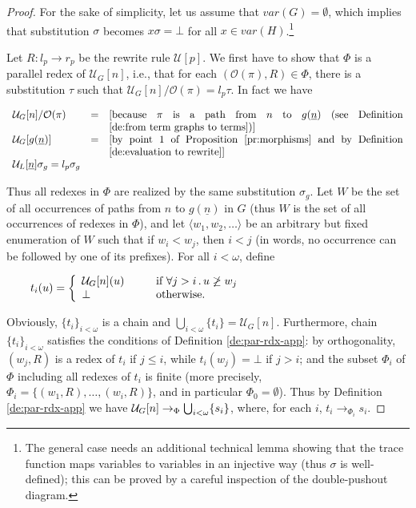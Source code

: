 \documentclass{eptcs}
\theoremstyle{plain}
\theoremstyle{definition}
\begin{document}
\begin{proof} 
For the sake of simplicity, let us assume that $var(G) = \emptyset$, 
which implies that substitution $\sigma$ becomes $x\sigma = \bot $ for 
all $x \in var(H)$.\footnote{The general case needs an 
additional technical lemma showing that the trace function maps 
variables to variables in an injective way (thus $\sigma$ is 
well-defined); this can be proved by a careful inspection of the 
double-pushout diagram.}

Let $R: l_p \rightarrow r_p$ be the rewrite rule $\mathcal{
U}[p]$. We first have to show that $\Phi$ is a parallel redex of 
$\mathcal{U}_G[n]$, i.e., that for each $(\mathcal{O}(\pi), R) \in \Phi$, 
there is a substitution $\tau$ such that $\mathcal{U}_G[n] / \mathcal{
O}(\pi) = l_p\tau$. In fact we have

\[\begin{array}{llp{10cm}}
\mathcal{U}_G[n] / \mathcal{O}(\pi) & = & [because $\pi$ is a path from $n$ 
to $g(\underline{n})$ (see Definition \ref{de:from term graphs to 
terms})]\\
\mathcal{U}_G[g(\underline{n})] & = & [by point 1 of Proposition 
\ref{pr:morphisms} and by Definition \ref{de:evaluation to rewrite}]\\
\mathcal{U}_L[\underline{n}]\sigma_g = l_p\sigma_g& &
\end{array}\]

\noindent
Thus all redexes in $\Phi$ are realized by the same substitution 
$\sigma_g$. Let $W$ be the set of all occurrences of paths from $n$ to 
$g(\underline{n})$ in $G$ (thus $W$ is the set of all occurrences of 
redexes in $\Phi$), and let $\langle w_1, w_2, \ldots \rangle$ be an 
arbitrary but fixed enumeration of $W$ such that if $w_i < w_j$, then 
$i < j$ (in words, no occurrence can be followed by one of its prefixes). For all 
$i < \omega$, define

\[t_i(u) = \left\{\begin{array}{l@{\hspace{1cm}}p{7cm}}
\mathcal{U}_G[n](u) & if $\forall j>i\,.\,u\not\ge w_j$\\
\bot & \mbox{otherwise.}
\end{array}
\right. \]

\noindent
Obviously, $\{t_i\}_{i< \omega}$ is a chain and $\bigcup_{i< \omega} 
\{t_i\} = \mathcal{U}_G[n]$. Furthermore, chain  $\{t_i\}_{i< \omega}$
satisfies the conditions of Definition \ref{de:par-rdx-app}: by orthogonality,
$(w_j, R)$ is a redex of $t_i$ if $j \leq i$,  while $t_i(w_j) = \bot$ if
$j > i$; and 
the subset $\Phi_i$ of $\Phi$
including all redexes of $t_i$ is finite (more precisely, $\Phi_i =
\{(w_1, R), \ldots, (w_i, R)\}$, and in particular $\Phi_0 =
\emptyset$). Thus by Definition \ref{de:par-rdx-app} we have ${\cal
  U}_G[n] \rightarrow_\Phi \bigcup_{i< \omega} \{s_i\}$, where, for
each $i$, $t_i \rightarrow_{\Phi_i} s_i$.


\end{proof}
\end{document}
